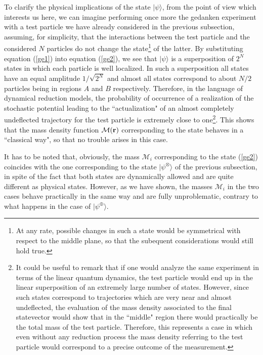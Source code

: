 \documentclass[10pt,a4paper]{article}
\begin{document}
To clarify the physical implications of the state $|\psi\rangle$,
from the point of view which interests us here, we can imagine
performing once more the gedanken experiment with a test particle
we have already considered in the previous subsection, assuming,
for simplicity, that the interactions between the test particle
and the considered $N$ particles do not change the
state\footnote{At any rate, possible changes in such a state would
be symmetrical with respect to the middle plane, so that the
subequent considerations would still hold true.} of the latter. By
substituting equation (\ref{ge1}) into equation (\ref{ge2}), we
see that $|\psi\rangle$ is a superposition of $2^{N}$ states in
which each particle is well localized. In such a superposition all
states have an equal amplitude $1/\sqrt{2^{N}}$  and almost all
states correspond to about $N/2$ particles being in regions $A$
and $B$ respectively. Therefore, in the language of dynamical
reduction models, the probability of occurrence of a realization
of the stochastic potential leading to the ``actualization" of an
almost completely undeflected trajectory for the test particle is
extremely close to one\footnote{It could be useful to remark that
if one would analyze the same experiment in terms of the  linear
quantum dynamics, the test particle would end up in the linear
superposition of an extremely large number of states. However,
since such states correspond to trajectories which are very near
and almost undeflected, the evaluation of the mass density
associated to  the final statevector would show that in the
``middle" region there would practically be  the total mass of the
test particle. Therefore, this represents a case in which even
without any reduction process the mass density referring to the
test particle would correspond to a precise outcome of the
measurement.}. This shows that the mass density function
${\mathcal M}({\bf r})$ corresponding to the state behaves in a
``classical way", so that no trouble arises in this case.

It has to be noted that, obviously, the mass ${\mathcal M}_{i}$
corresponding to the state (\ref{ge2}) coincides with the one
corresponding to the state $|\psi^{\otimes}\rangle$ of the
previous subsection, in spite of the fact that both states are
dynamically allowed and are quite different as physical states.
However, as we have shown, the masses ${\mathcal M}_{i}$ in the
two cases behave practically in the same way and are fully
unproblematic, contrary to what happens in the case of
$|\psi^{\oplus}\rangle$.
\end{document}
